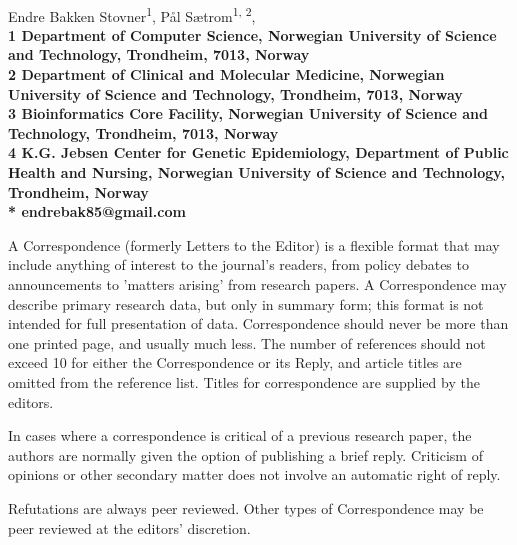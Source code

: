 \documentclass[10pt,letterpaper]{article}
\begin{document}
\vspace*{0.35in}

\begin{flushleft}
{\Large
  \textbf{}
}
\newline
\\
Endre Bakken Stovner\textsuperscript{1},
Pål Sætrom\textsuperscript{1, 2},
\\
\bf{1} Department of
  Computer Science, Norwegian University
  of Science and Technology, Trondheim, 7013, Norway
\\
\bf{2} Department of Clinical and Molecular Medicine, Norwegian
  University of Science and Technology, Trondheim, 7013, Norway
\\
\bf{3} Bioinformatics Core Facility, Norwegian University of Science and
Technology, Trondheim, 7013, Norway
\\
\bf{4} K.G. Jebsen Center for Genetic Epidemiology, Department of Public Health
and Nursing, Norwegian University of Science and Technology, Trondheim, Norway
\\
\bigskip
* endrebak85@gmail.com

\end{flushleft}

A Correspondence (formerly Letters to the Editor) is a flexible format that may include anything of interest to the journal's readers, from policy debates to announcements to 'matters arising' from research papers. A Correspondence may describe primary research data, but only in summary form; this format is not intended for full presentation of data. Correspondence should never be more than one printed page, and usually much less. The number of references should not exceed 10 for either the Correspondence or its Reply, and article titles are omitted from the reference list. Titles for correspondence are supplied by the editors.

In cases where a correspondence is critical of a previous research paper, the authors are normally given the option of publishing a brief reply. Criticism of opinions or other secondary matter does not involve an automatic right of reply.

Refutations are always peer reviewed. Other types of Correspondence may be peer reviewed at the editors' discretion.
\end{document}
